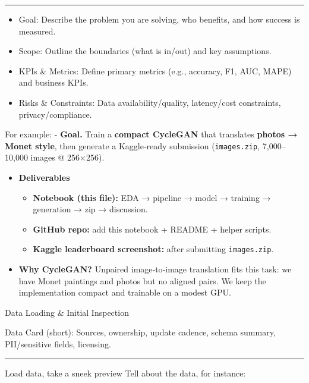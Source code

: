 \documentclass[
  letterpaper,
  DIV=11,
  numbers=noendperiod]{scrartcl}
\providecommand{\tightlist}{%
  \setlength{\itemsep}{0pt}\setlength{\parskip}{0pt}}
\begin{document}
\begin{center}\rule{0.5\linewidth}{0.5pt}\end{center}

\begin{itemize}
\tightlist
\item
  Goal: Describe the problem you are solving, who benefits, and how
  success is measured.
\item
  Scope: Outline the boundaries (what is in/out) and key assumptions.
\item
  KPIs \& Metrics: Define primary metrics (e.g., accuracy, F1, AUC,
  MAPE) and business KPIs.
\item
  Risks \& Constraints: Data availability/quality, latency/cost
  constraints, privacy/compliance.
\end{itemize}

For example: - \textbf{Goal.} Train a \textbf{compact CycleGAN} that
translates \textbf{photos → Monet style}, then generate a Kaggle‑ready
submission (\texttt{images.zip}, 7,000--10,000 images @ 256×256).

\begin{itemize}
\tightlist
\item
  \textbf{Deliverables}

  \begin{itemize}
  \tightlist
  \item
    \textbf{Notebook (this file):} EDA → pipeline → model → training →
    generation → zip → discussion.
  \item
    \textbf{GitHub repo:} add this notebook + README + helper scripts.
  \item
    \textbf{Kaggle leaderboard screenshot:} after submitting
    \texttt{images.zip}.
  \end{itemize}
\item
  \textbf{Why CycleGAN?} Unpaired image‑to‑image translation fits this
  task: we have Monet paintings and photos but no aligned pairs. We keep
  the implementation compact and trainable on a modest GPU.
\end{itemize}

Data Loading \& Initial Inspection

Data Card (short): Sources, ownership, update cadence, schema summary,
PII/sensitive fields, licensing.

\begin{center}\rule{0.5\linewidth}{0.5pt}\end{center}

Load data, take a sneek preview Tell about the data, for instance:
\end{document}
